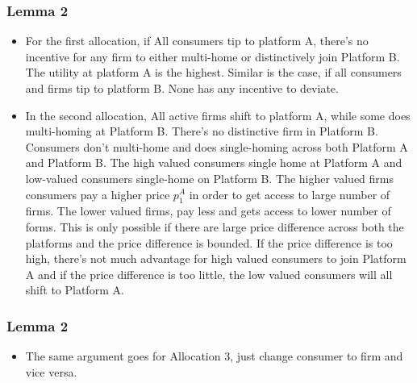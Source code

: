 \documentclass[11pt]{beamer}
\theoremstyle{boldstyle}
\begin{document}
\begin{frame}
	\frametitle{Lemma 2}
	\begin{small}
\begin{itemize}
	\item For the first allocation, if All consumers tip to platform A, there's no incentive for any firm to either multi-home or distinctively join Platform B. The utility at platform A is the highest. Similar is the case, if all consumers and firms tip to platform B. None has any incentive to deviate. 
	\item In the second allocation, All active firms shift to platform A, while some does multi-homing at Platform B. There's no distinctive firm in Platform B. Consumers don't multi-home and does single-homing across both Platform A and Platform B. The high valued consumers single home at Platform A and low-valued consumers single-home on Platform B. The higher valued firms consumers pay a higher price $p_1^A$ in order to get access to large number of firms. The lower valued firms, pay less and gets access to lower number of forms.  This is only possible if there are large price difference across both the platforms and the price difference is bounded. If the price difference is too high, there's not much advantage for high valued consumers to join Platform A and if the price difference is too little, the low valued consumers will all shift to Platform A. 
\end{itemize}
	\end{small}
\end{frame}

\begin{frame}
	\frametitle{Lemma 2}
	\begin{small}
		\begin{itemize}
			\item The same argument goes for Allocation 3, just change consumer to firm and vice versa. 
			
		\end{itemize}
	\end{small}
\end{frame}
\end{document}
